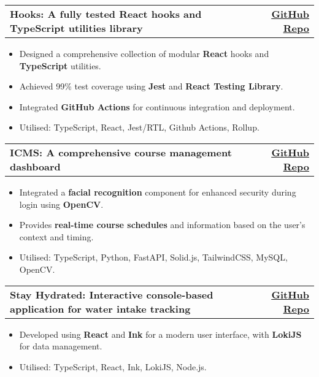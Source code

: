 \documentclass[a4paper,11pt]{article}
\makeatletter
\newcommand{\resumeItem}[1]{
  \item\small{
    {#1 \vspace{-2pt}}
  }
}
\newcommand{\resumeProjectHeading}[2]{
  \item
  \begin{tabular*}{1.001\textwidth}{l@{\extracolsep{\fill}}r}
    \small#1 & \textbf{\small #2}\\
  \end{tabular*}\vspace{-7pt}
}
\newcommand{\resumeItemListStart}{\begin{itemize}}
\newcommand{\resumeItemListEnd}{\end{itemize}\vspace{-5pt}}
\makeatother
\begin{document}
\resumeProjectHeading{\textbf{Hooks: A fully tested React hooks and TypeScript utilities library}}{\href{https://github.com/chanyatfu/hooks}{\underline{GitHub Repo}}}
\resumeItemListStart
\resumeItem{Designed a comprehensive collection of modular \textbf{React} hooks and \textbf{TypeScript} utilities.}
\resumeItem{Achieved 99\% test coverage using \textbf{Jest} and \textbf{React Testing Library}.}
\resumeItem{Integrated \textbf{GitHub Actions} for continuous integration and deployment.}
\resumeItem{Utilised: TypeScript, React, Jest/RTL, Github Actions, Rollup.}
\resumeItemListEnd
\vspace{-15pt}

\resumeProjectHeading{\textbf{ICMS: A comprehensive course management dashboard}}{\href{https://github.com/chanyatfu/ICMS}{\underline{GitHub Repo}}}
\resumeItemListStart
\resumeItem{Integrated a \textbf{facial recognition} component for enhanced security during login using \textbf{OpenCV}.}
\resumeItem{Provides \textbf{real-time course schedules} and information based on the user's context and timing.}
\resumeItem{Utilised: TypeScript, Python, FastAPI, Solid.js, TailwindCSS, MySQL, OpenCV.}
\vspace{-15pt}
\resumeItemListEnd

\resumeProjectHeading{\textbf{Stay Hydrated: Interactive console-based application for water intake tracking}}{\href{https://github.com/chanyatfu/stay-hydrated}{\underline{GitHub Repo}}}
\resumeItemListStart
\resumeItem{Developed using \textbf{React} and \textbf{Ink} for a modern user interface, with \textbf{LokiJS} for data management.}
\resumeItem{Utilised: TypeScript, React, Ink, LokiJS, Node.js.}
\resumeItemListEnd



\end{document}
